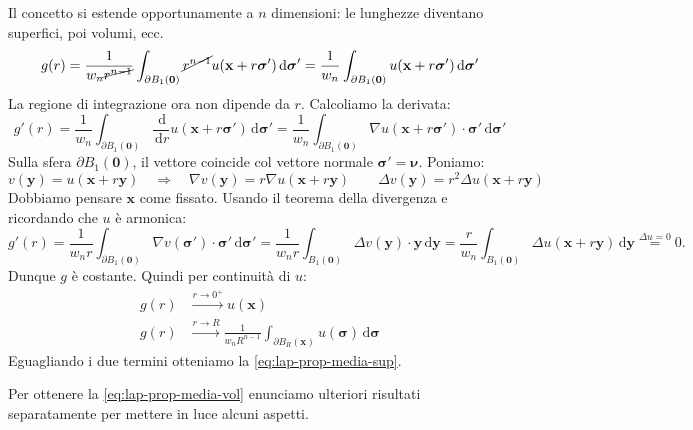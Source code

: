 \documentclass[10pt,a4paper,twoside,openright]{book}
\newcommand{\x}{\mathbf{x}}
\newcommand{\y}{\mathbf{y}}
\newcommand{\zer}{\mathbf{0}}
\newcommand{\sigg}{\bm{\sigma}}
\newcommand{\nuu}{\bm{\nu}}
\newcommand{\de}{\,\mathrm d}
\newcommand{\dr}{\de r}
\newcommand{\dyy}{\de \y}
\newcommand{\dsig}{\de \sigg}
\begin{document}
\begin{dimostrazione}
	Il concetto si estende opportunamente a $n$ dimensioni: le lunghezze diventano superfici, poi volumi, ecc.
	\begin{equation*}
	g(r) =\frac{1}{w_{n}\cancel{r^{n-1}}}\int _{\partial B_{1}(\zer)}\cancel{r^{n-1}} u(\x +r\sigg ') \dsig '=\frac{1}{w_{n}}\int _{\partial B_{1}(\zer)} u(\x +r\sigg ') \dsig '
	\end{equation*}
	La regione di integrazione ora non dipende da $r$. Calcoliamo la derivata:
	\begin{equation*}
	g'(r) =\frac{1}{w_{n}}\int _{\partial B_{1}(\zer)}\frac{\de}{\dr} u(\x +r\sigg ') \dsig '=\frac{1}{w_{n}}\int _{\partial B_{1}(\zer)} \nabla u(\x +r\sigg ') \cdotp \sigg '\dsig '
	\end{equation*}
	Sulla sfera $\displaystyle \partial B_{1}(\zer)$, il vettore coincide col vettore normale $\displaystyle \sigg '=\nuu$.
	Poniamo:
	\begin{equation*}
		v(\y)=u(\x+r\y) \quad \Rightarrow \quad \nabla v(\y)=r\nabla u(\x+r\y)\qquad \Delta v(\y)=r^2 \Delta u(\x+r\y)
	\end{equation*}
	Dobbiamo pensare $\x$ come fissato. Usando il teorema della divergenza e ricordando che $u$ è armonica:
	\begin{equation*}
	g'(r) =\frac{1}{w_{n}r}\int _{\partial B_{1}(\zer)} \nabla  v(\sigg') \cdot \sigg' \dsig' =\frac{1}{w_{n}r}\int _{B_{1}(\zer)} \Delta   v(\y) \cdot \y \dyy   =\frac{r}{w_{n}}\int _{B_{1}(\zer)} \Delta u(\x +r\y) \dyy\overset{\Delta u=0}{=} 0.
	\end{equation*}
	Dunque $g$ è costante. Quindi per continuità di $u$:
	\begin{align*}
		g(r) & \xrightarrow{r\rightarrow 0^{+}} u(\x)\\
		g(r) & \xrightarrow{r\rightarrow R}\frac{1}{w_{n} R^{n-1}}\int _{\partial B_{R}(\x)} u(\sigg) \dsig
	\end{align*}
	Eguagliando i due termini otteniamo la \eqref{eq:lap-prop-media-sup}.
	
	Per ottenere la \eqref{eq:lap-prop-media-vol} enunciamo ulteriori risultati separatamente per mettere in luce alcuni aspetti.
\end{dimostrazione}
\end{document}
